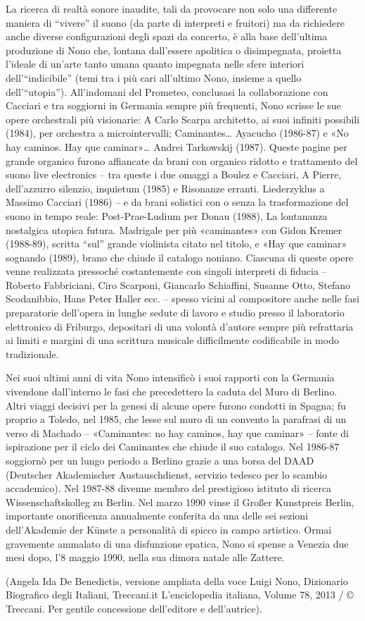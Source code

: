 La ricerca di realtà sonore inaudite, tali da provocare non solo una differente maniera di “vivere” il suono (da parte di interpreti e fruitori) ma da richiedere anche diverse configurazioni degli spazi da concerto, è alla base dell’ultima produzione di Nono che, lontana dall’essere apolitica o disimpegnata, proietta l’ideale di un’arte tanto umana quanto impegnata nelle sfere interiori dell’“indicibile” (temi tra i più cari all’ultimo Nono, insieme a quello dell’“utopia”). All’indomani del Prometeo, conclusasi la collaborazione con Cacciari e tra soggiorni in Germania sempre più frequenti, Nono scrisse le sue opere orchestrali più visionarie: A Carlo Scarpa architetto, ai suoi infiniti possibili (1984), per orchestra a microintervalli; Caminantes… Ayacucho (1986-87) e «No hay caminos. Hay que caminar»… Andrei Tarkowskij (1987). Queste pagine per grande organico furono affiancate da brani con organico ridotto e trattamento del suono live electronics – tra queste i due omaggi a Boulez e Cacciari, A Pierre, dell’azzurro silenzio, inquietum (1985) e Risonanze erranti. Liederzyklus a Massimo Cacciari (1986) – e da brani solistici con o senza la trasformazione del suono in tempo reale: Post-Prae-Ludium per Donau (1988), La lontananza nostalgica utopica futura. Madrigale per più «caminantes» con Gidon Kremer (1988-89), scritta “sul” grande violinista citato nel titolo, e «Hay que caminar» sognando (1989), brano che chiude il catalogo noniano. Ciascuna di queste opere venne realizzata pressoché costantemente con singoli interpreti di fiducia – Roberto Fabbriciani, Ciro Scarponi, Giancarlo Schiaffini, Susanne Otto, Stefano Scodanibbio, Hans Peter Haller ecc. – spesso vicini al compositore anche nelle fasi preparatorie dell’opera in lunghe sedute di lavoro e studio presso il laboratorio elettronico di Friburgo, depositari di una volontà d’autore sempre più refrattaria ai limiti e margini di una scrittura musicale difficilmente codificabile in modo tradizionale.

Nei suoi ultimi anni di vita Nono intensificò i suoi rapporti con la Germania vivendone dall’interno le fasi che precedettero la caduta del Muro di Berlino. Altri viaggi decisivi per la genesi di alcune opere furono condotti in Spagna; fu proprio a Toledo, nel 1985, che lesse sul muro di un convento la parafrasi di un verso di Machado – «Caminantes: no hay caminos, hay que caminar» – fonte di ispirazione per il ciclo dei Caminantes che chiude il suo catalogo. Nel 1986-87 soggiornò per un lungo periodo a Berlino grazie a una borsa del DAAD (Deutscher Akademischer Austauschdienst, servizio tedesco per lo scambio accademico). Nel 1987-88 divenne membro del prestigioso istituto di ricerca Wissenschaftskolleg zu Berlin. Nel marzo 1990 vinse il Großer Kunstpreis Berlin, importante onorificenza annualmente conferita da una delle sei sezioni dell’Akademie der Künste a personalità di spicco in campo artistico. Ormai gravemente ammalato di una disfunzione epatica, Nono si spense a Venezia due mesi dopo, l’8 maggio 1990, nella sua dimora natale alle Zattere.

(Angela Ida De Benedictis, versione ampliata della voce Luigi Nono, Dizionario Biografico degli Italiani, Treccani.it L’enciclopedia italiana, Volume 78, 2013 / © Treccani. Per gentile concessione dell’editore e dell’autrice).